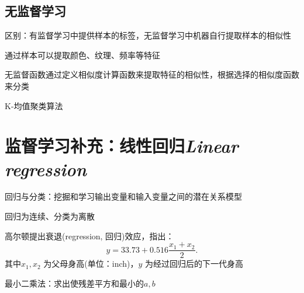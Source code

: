 \subsection{无监督学习}%
\label{sub:无监督学习}
\begin{notation}
    区别：有监督学习中提供样本的标签，无监督学习中机器自行提取样本的相似性
\end{notation}
通过样本可以提取颜色、纹理、频率等特征

无监督函数通过定义相似度计算函数来提取特征的相似性，根据选择的相似度函数来分类
\begin{notation}
    K-均值聚类算法
\end{notation}
\section*{监督学习补充：线性回归\textit{Linear regression} }%
\label{sec:监督学习补充：线性回归}
\begin{defi}
    回归与分类：挖掘和学习输出变量和输入变量之间的潜在关系模型

    回归为连续、分类为离散
\end{defi}
\begin{eg}
    高尔顿提出衰退(regression, 回归)效应，指出：\[
        y=33.73+0.516 \frac{x_1+x_2}{2} 
    .\] 
    其中$x_1,x_2$ 为父母身高(单位：inch)，$y$ 为经过回归后的下一代身高
\end{eg}
\begin{notation}
    最小二乘法：求出使残差平方和最小的$a,b$
\end{notation}




